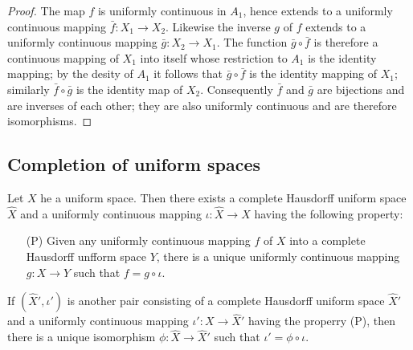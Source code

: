 \begin{proof}
The map $f$ is uniformly continuous in $A_1$, hence extends to a uniformly continuous mapping $\bar{f}:X_1\to X_2$. Likewise the inverse $g$ of $f$ extends to a uniformly continuous mapping $\bar{g}:X_2\to X_1$. The function $\bar{g}\circ\bar{f}$ is therefore a continuous mapping of $X_1$ into itself whose restriction to $A_1$ is the identity mapping; by the desity of $A_1$ it follows that $\bar{g}\circ\bar{f}$ is the identity mapping of $X_1$; similarly $\bar{f}\circ\bar{g}$ is the identity map of $X_2$. Consequently $\bar{f}$ and $\bar{g}$ are bijections and are inverses of each other; they are also uniformly continuous and are therefore isomorphisms.
\end{proof}
\subsection{Completion of uniform spaces}
\begin{theorem}\label{completion of uniform space}
Let $X$ he a uniform space. Then there exists a complete Hausdorff uniform space $\widehat{X}$ and a uniformly continuous mapping $\iota:\widehat{X}\to X$ having the following property:
\begin{itemize}
\item[(P)] Given any uniformly continuous mapping $f$ of $X$ into a complete Hausdorff unfform space $Y$, there is a unique uniformly continuous mapping $g:X\to Y$ such that $f=g\circ\iota$.
\end{itemize}
If $(\widehat{X}',\iota')$ is another pair consisting of a complete Hausdorff uniform space $\widehat{X}'$ and a uniformly continuous mapping $\iota':X\to\widehat{X}'$ having the properry (P), then there is a unique isomorphism $\phi:\widehat{X}\to\widehat{X}'$ such that $\iota'=\phi\circ\iota$.
\end{theorem}
